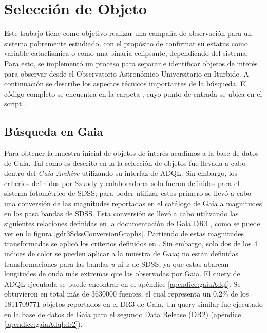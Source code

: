\chapter{Selección de Objeto} \label{muestra:crit_seleccion}

Este trabajo tiene como objetivo realizar una campaña de observación para un
sistema pobremente estudiado, con el propósito de confirmar su estatus como
variable cataclísmica o como una binaria eclipsante, dependiendo del sistema.
Para esto, se implementó un proceso para separar e identificar objetos de
interés para observar desde el Observatorio Astronómico Universitario en
Iturbide. A continuación se describe los aspectos técnicos importantes de la
búsqueda. El código completo se encuentra en la carpeta
\href{https://github.com/KnightIV/UANL_MAPTA_Observaciones/tree/main/obsrv_plan}{},
cuyo punto de entrada se ubica en el script
\href{URLhttps://github.com/KnightIV/UANL_MAPTA_Observaciones/blob/main/obsrv_plan/main.py}{}.

\section{Búsqueda en Gaia}  \label{muestra:crit_seleccion:busqueda_fotometrica}

Para obtener la muestra inicial de objetos de interés acudimos a la base de
datos de Gaia. Tal como es descrito en la  la
selección de objetos fue llevada a cabo dentro del \textit{Gaia Archive}
utilizando su interfaz de ADQL. Sin embargo, los criterios definidos por Szkody
y colaboradores solo fueron definidos para el sistema fotométrico de SDSS; para
poder utilizar estos primero se llevó a cabo una conversión de las magnitudes
reportadas en el catálogo de Gaia a magnitudes en los pasa bandas de SDSS. Esta
conversión se llevó a cabo utilizando las siguientes relaciones definidas en la
documentación de Gaia DR3 , como se puede
ver en la figura \ref{gdr3SdssConversionGraphs}. Partiendo de estas magnitudes
transformadas se aplicó los criterios definidos en
. Sin embargo, solo dos de los 4 indices de color
se pueden aplicar a la muestra de Gaia; no están definidas transformaciones para
las bandas $u$ ni $z$ de SDSS, ya que estas abarcan longitudes de onda más
extremas que las observadas por Gaia. El query de ADQL ejecutada se puede
encontrar en el apéndice \ref{apendice:gaiaAdql}. Se obtuvieron en total más de
\num{3630000} fuentes, el cual representa un 0.2\% de los \num{1811709771} objetos
reportados en el DR3 de Gaia. Un query similar fue ejecutado en la base de datos
de Gaia para el segundo Data Release (DR2) (apéndice \ref{apendice:gaiaAdql:dr2}). 

